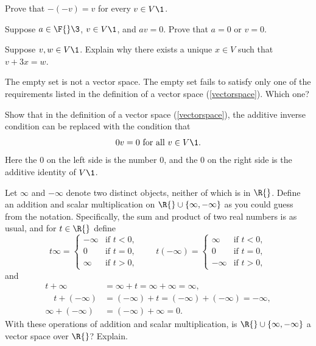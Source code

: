 
\exercise
Prove that $-(-v) = v$ for every $v \in V\1$.


\exercise
Suppose $a \in \F{}\3$, $v \in V\1$, and $av = 0$. Prove that $a = 0$ or $v = 0$.


\exercise
Suppose $v, w \in V\1$. Explain why there exists a unique $x \in V$ such that $v + 3x = w$.


\exercise
The empty set is not a vector space. The empty set fails to satisfy only one of the requirements listed in the definition of a vector space (\ref{vectorspace}). Which one?


\exercise
Show that in the definition of a vector space (\ref{vectorspace}), the additive inverse condition can be replaced with the condition that
\[
0v = 0 \text{ for all } v \in V\1.
\]
Here the $0$ on the left side is the number $0$, and the $0$ on the right side is the additive identity of $V\1$.


\exercise
Let $\infty$ and $-\infty$ denote two distinct objects, neither of which is in $\R{}$. Define an addition and scalar multiplication on
$\R{} \cup \{\infty, -\infty\}$ as you could guess from the notation. Specifically, the sum and product of two real numbers is as usual, and for
$t \in \R{}$ define
\vspace{-.08in}
\[
t \infty =
\begin{cases}
-\infty & \text{if } t < 0,\\
0 & \text{if } t = 0,\\
\infty & \text{if } t > 0,
\end{cases}
\quad\quad
t (-\infty) =
\begin{cases}
\infty & \text{if } t < 0,\\
0 & \text{if } t = 0,\\
-\infty & \text{if } t > 0,
\end{cases}
\]
and
\begin{align*}
t + \infty &= \infty + t = \infty + \infty = \infty,\\[-1bp]
\quad t + (-\infty) &= (-\infty) + t  = (-\infty) + (-\infty) = -\infty,\\[-1bp]
\infty + (-\infty) &= (-\infty) + \infty = 0.
\end{align*}
With these operations of addition and scalar multiplication, is $\R{} \cup \{\infty,-\infty\}$ a vector space over $\R{}$? Explain.


